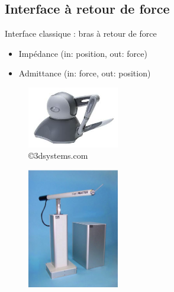 \subsection{Interface à retour de force}
\begin{frame}{Interface classique : bras à retour de force}
\begin{itemize}
\item Impédance (in: position, out: force)
\item Admittance (in: force, out: position)
\end{itemize}

\begin{multicols}{2}
\begin{figure}
\centering
\includegraphics[width=4cm]{images/phantom}
\caption{\copyright 3dsystems.com}
\end{figure}
%
\begin{figure}
\centering
\includegraphics[width=4cm]{images/hapticMaster}
\caption{\cite{VanderLinde2002}}
\end{figure}
\end{multicols}
\end{frame}

